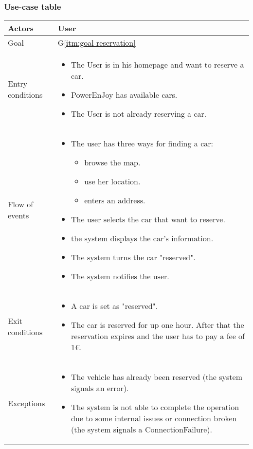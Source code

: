 \newpage
\subsubsection{Use-case table}
\begin{center}
  \begin{tabular}{ l | p{10cm} }
    \hline
    Actors & User\\ \hline
    Goal & G\ref{itm:goal-reservation}\\ \hline
    Entry conditions & 
    \begin{itemize}
			\item The User is in his homepage and want to reserve a car.
			\item PowerEnJoy has available cars.
			\item The User is not already reserving a car.
    \end{itemize}  \\ \hline
    Flow of events &
    \begin{itemize}
      \item The user has three ways for finding a car:
      \begin{itemize}
      			\item browse the map.
      			\item use her location.
      			\item enters an address.
      \end{itemize}
      \item The user selects the car that want to reserve.
      \item the system displays the car's information.%
      \item The system turns the car "reserved".%
      \item The system notifies the user.
    \end{itemize} \\ \hline
    Exit conditions &
    \begin{itemize}
    	\item A car is set as "reserved".
    	\item The car is reserved for up one hour. After that the reservation expires and the user has to pay a fee of 1€.
    \end{itemize}  \\ \hline
    Exceptions & 
    \begin{itemize}
    \item The vehicle has already been reserved (the system signals an error).
    \item The system is not able to complete the operation due to some internal issues or connection broken (the system signals a ConnectionFailure).
    \end{itemize}  \\ \hline
  \end{tabular}
\end{center}


